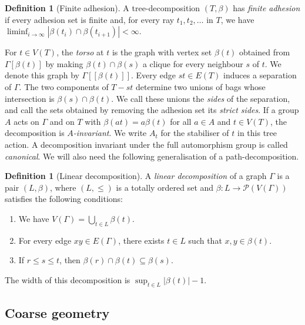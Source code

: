\documentclass[10pt,a4paper]{amsart}
\theoremstyle{definition}
\newtheorem{definition}[theorem]{Definition}
\begin{document}
\begin{definition}[Finite adhesion]\label{def:finite-adhesion}
A tree-decomposition $(T,\beta)$ has \emph{finite adhesion} if every adhesion set is finite and, for every ray $t_1,t_2,\ldots$ in $T$, we have $\liminf_{i\to\infty}|\beta(t_i)\cap\beta(t_{i+1})|<\infty$.
\end{definition}

For $t\in V(T)$, the \emph{torso} at $t$ is the graph with vertex set $\beta(t)$ obtained from $\Gamma[\beta(t)]$ by making $\beta(t)\cap\beta(s)$ a clique for every neighbour $s$ of $t$.
We denote this graph by $\Gamma[\![\beta(t)]\!]$.
Every edge $st\in E(T)$ induces a separation of $\Gamma$.
The two components of $T-st$ determine two unions of bags whose intersection is $\beta(s)\cap\beta(t)$.
We call these unions the \emph{sides} of the separation, and call the sets obtained by removing the adhesion set its \emph{strict sides}.
If a group $A$ acts on $\Gamma$ and on $T$ with $\beta(at)=a\beta(t)$ for all $a\in A$ and $t\in V(T)$, the decomposition is \emph{$A$-invariant}.
We write $A_t$ for the stabiliser of $t$ in this tree action.
A decomposition invariant under the full automorphism group is called \emph{canonical}.
We will also need the following generalisation of a path-decomposition.

\begin{definition}[Linear decomposition]\label{def:linear-decomposition}
A \emph{linear decomposition} of a graph $\Gamma$ is a pair $(L,\beta)$, where $(L,\leq)$ is a totally ordered set and $\beta:L\to\mathcal{P}(V(\Gamma))$ satisfies the following conditions:
\begin{enumerate}
\item[(L1)] We have $V(\Gamma)=\bigcup_{t\in L}\beta(t)$.
\item[(L2)] For every edge $xy\in E(\Gamma)$, there exists $t\in L$ such that $x,y\in\beta(t)$.
\item[(L3)] If $r\leq s\leq t$, then $\beta(r)\cap\beta(t)\subseteq\beta(s)$.
\end{enumerate}
The width of this decomposition is $\sup_{t\in L}|\beta(t)|-1$.
\end{definition}

\subsection{Coarse geometry}\label{subsec:coarse-geometry}
\end{document}
